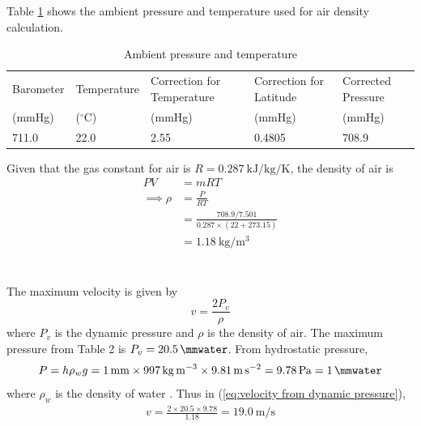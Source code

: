 \section{}
Table \ref{tab:ambient_pressure_and_temperature} shows the ambient pressure and temperature used for air density calculation.

\begin{table}[h]
    \centering
    \caption{Ambient pressure and temperature}
    \label{tab:ambient_pressure_and_temperature}
    \begin{tabular}{p{2cm}p{2cm}p{2cm}p{2cm}p{2cm}}
        \toprule
        Barometer & Temperature & Correction for Temperature & Correction for Latitude & Corrected Pressure \\
        (mmHg) & ($^\circ$C) & (mmHg) & (mmHg) & (mmHg) \\
        \midrule
        711.0 & 22.0 & 2.55 & 0.4805 & 708.9 \\
        \bottomrule
    \end{tabular}
\end{table}

Given that the gas constant for air is $R = \qty{0.287}{\kilo\joule\per\kilogram\per\kelvin}$, the density of air is
\begin{align*}
    PV &= mRT \\
    \implies \rho &= \frac{P}{RT} \\
    &= \frac{708.9/7.501}{0.287 \times (22 + 273.15)} \\
    &= \boxed{\qty{1.18}{\kilogram\per\meter\cubed}}
\end{align*}

\section{}
The maximum velocity is given by
\begin{equation}
    v = \frac{2 P_v}{\rho} \label{eq:velocity from dynamic pressure}
\end{equation}
where $P_v$ is the dynamic pressure and $\rho$ is the density of air. The maximum pressure from 
Table 2 is $P_v = \qty{20.5}{\mmwater}$. From hydrostatic pressure,
\begin{equation*}
    P = h \rho_w g = \qty{1}{\milli\meter} \times \qty{997}{\kilogram\per\meter\cubed} \times \qty{9.81}{\meter\per\second\squared} = \qty{9.78}{\pascal} = \qty{1}{\mmwater}
\end{equation*}
where $\rho_w$ is the density of water \cite{bigg_density_1967}. Thus in (\ref{eq:velocity from dynamic pressure}),
\begin{align*}
    v = \frac{2 \times 20.5 \times 9.78}{1.18} = \boxed{\qty{19.0}{\meter\per\second}}
\end{align*}

